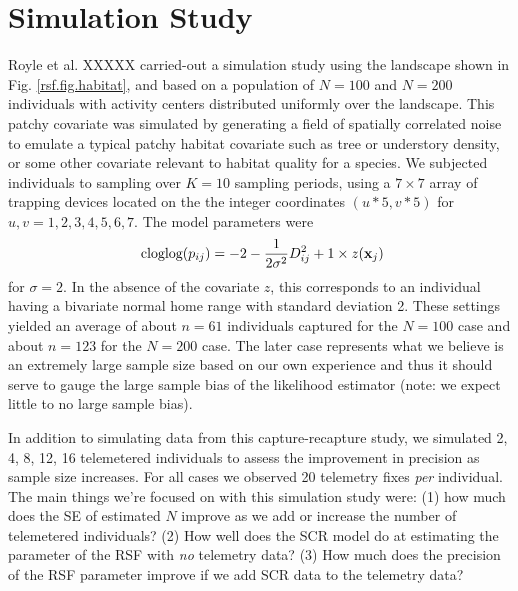 \section{Simulation Study}

Royle et al. XXXXX 
 carried-out a simulation study using the landscape shown in
Fig. \ref{rsf.fig.habitat}, and based on a population of $N=100$ and $N=200$
individuals with activity centers distributed uniformly over the
landscape.  This patchy covariate was simulated by generating a field
of spatially correlated noise to emulate a typical patchy habitat
covariate such as tree or understory density, or some other covariate
relevant to habitat quality for a species.  We subjected individuals
to sampling over $K=10$ sampling periods, using a $7 \times 7$ array
of trapping devices located on the the integer coordinates $(u*5,v*5)$
for $u,v = 1,2,3,4,5,6,7$. The model parameters were
\[
\mbox{ cloglog}(p_{ij}) = -2  -\frac{1}{2\sigma^{2}} D_{ij}^{2} + 1 \times z({\bf x}_{j})
\]
for $\sigma =2$. In the absence of the covariate $z$, this corresponds
to an individual having a bivariate normal home range with standard
deviation 2.
These settings yielded an average of about $n=61$ individuals captured for
the $N=100$ case and about $n=123$ for the $N=200$ case. The later case
represents what we believe is an extremely large sample size based on
our own experience and thus it should serve to gauge the large sample
bias of the likelihood estimator (note: we expect little to no large
sample bias).

In addition to simulating data from this capture-recapture study, we
simulated 2, 4, 8, 12, 16 telemetered individuals to assess the
improvement in precision as sample size increases.  For all cases we
observed 20 telemetry fixes {\it per} individual.  The main things
we're focused on with this simulation study were: (1) how much does
the SE of estimated $N$ improve as we add or increase the number of
telemetered individuals?  (2) How well does the SCR model do at
estimating the parameter of the RSF with {\it no} telemetry data?  (3)
How much does the precision of the RSF parameter improve if we add SCR
data to the telemetry data?



